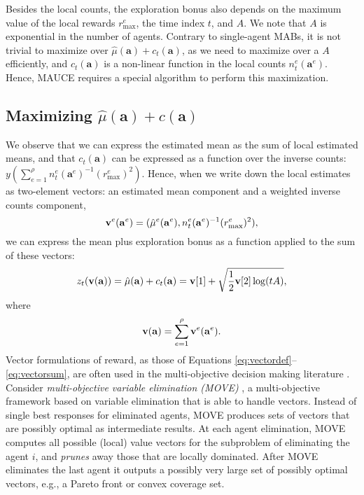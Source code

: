 \documentclass{article}
\newcommand{\est}{\hat{\mu}}
\def\hado#1{\textcolor{RubineRed}{\textbf{Hado: ``#1''}}}
\begin{document}
Besides the local counts, the exploration bonus also depends on the maximum value of the local rewards $r_{\max}^e$, the time index $t$, and $A$. We note that $A$ is exponential in the number of agents. %
%
Contrary to single-agent MABs, it is not trivial to maximize over $\est(\mathbf{a}) + c_t(\mathbf{a})$, as we need to maximize over a $A$ efficiently, and $c_t(\mathbf{a})$ is a non-linear function in the local counts $n^e_t(\mathbf{a}^e)$. Hence, MAUCE requires a special algorithm to perform this maximization.

\subsection{Maximizing $\est(\mathbf{a}) + c(\mathbf{a})$}\label{sec:ucve}
 We observe that we can express the estimated mean as the sum of local estimated means, and that $c_t(\mathbf{a})$ can be expressed as a function over the inverse counts: $y(\sum_{e=1}^\rho n^e_t(\mathbf{a}^e)^{-1} (r_{\max}^e)^2)$. Hence, when we write down the local estimates as two-element vectors: an estimated mean component and a weighted inverse counts component,
\begin{equation}\label{eq:vectordef}
 {\bf v}^e({\bf a}^e) =   (\est^e(\mathbf{a}^e), n^e_t(\mathbf{a}^e)^{-1} (r_{\max}^e)^2),
\end{equation}
we can express the mean plus exploration bonus as a function applied to the sum of these vectors:
\begin{equation}\label{eq:zfunction}
 z_t( {\bf v}({\bf a})) = \est(\mathbf{a}) + c_t(\mathbf{a}) = {\bf v}[1] + \sqrt{ \frac{1}{2}  {\bf v}[2] \log ( t A )},
\end{equation}
where
\begin{equation}\label{eq:vectorsum}
{\bf v}({\bf a}) = \sum^\rho_{e=1}  {\bf v}^e({\bf a}^e) .
\end{equation}
Vector formulations of reward, as those of Equations \ref{eq:vectordef}--\ref{eq:vectorsum}, are
often used in the multi-objective decision making literature \cite{roijers2017multi}. Consider
\emph{multi-objective variable elimination (MOVE)} \cite{Rollon06MOBE,roijers2015computing}, a
multi-objective framework based on variable elimination that is able to handle vectors. Instead of single best responses for eliminated agents, MOVE produces sets of vectors that are possibly optimal as intermediate results. At each agent elimination, MOVE computes all possible (local) value vectors for the subproblem of eliminating the agent $i$, and \emph{prunes} away those that are locally dominated. After MOVE eliminates the last agent it outputs a possibly very large set of possibly optimal vectors, e.g., a Pareto front or convex coverage set.
\end{document}
